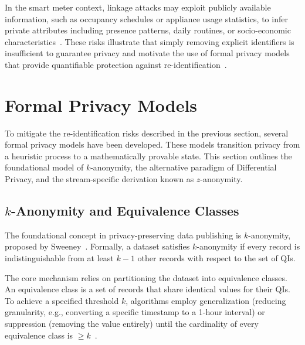 In the smart meter context, linkage attacks may exploit publicly available information, such as occupancy schedules or appliance usage statistics, to infer private attributes including presence patterns, daily routines, or socio-economic characteristics~\cite{RevealingHouseholdCharacteristicsSM}. These risks illustrate that simply removing explicit identifiers is insufficient to guarantee privacy and motivate the use of formal privacy models that provide quantifiable protection against re-identification~\cite{Sweeney_kanon}.


\section{Formal Privacy Models}
\label{sec:FormalPrivacyModels}

To mitigate the re-identification risks described in the previous section, several formal privacy models have been developed. These models transition privacy from a heuristic process to a mathematically provable state. This section outlines the foundational model of $k$-anonymity, the alternative paradigm of Differential Privacy, and the stream-specific derivation known as $z$-anonymity.

\subsection{\texorpdfstring{$k$}{k}-Anonymity and Equivalence Classes}
The foundational concept in privacy-preserving data publishing is $k$-anonymity, proposed by Sweeney~\cite{Sweeney_kanon}. Formally, a dataset satisfies $k$-anonymity if every record is indistinguishable from at least $k-1$ other records with respect to the set of \acp{QI}.

The core mechanism relies on partitioning the dataset into equivalence classes. An equivalence class is a set of records that share identical values for their \acp{QI}. To achieve a specified threshold $k$, algorithms employ generalization (reducing granularity, e.g., converting a specific timestamp to a 1-hour interval) or suppression (removing the value entirely) until the cardinality of every equivalence class is $\geq k$~\cite{Sweeney_kanon}.

